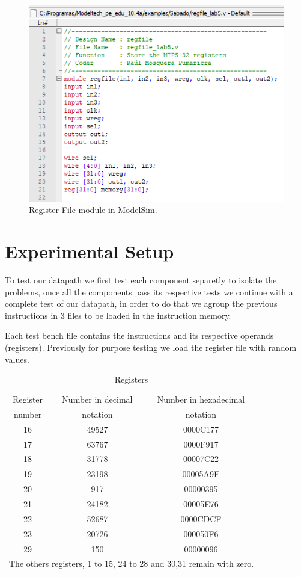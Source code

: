 \documentclass[conference]{IEEEtran}
\begin{document}
\begin{figure}[htbp]
\centerline{\includegraphics[scale=0.7]{modelsim_module.png}}
\caption{Register File module in ModelSim.}
\label{fig}
\end{figure}

\section{Experimental Setup} %
To test our datapath we first test each component separetly to isolate the
problems, once all the components pass its respective tests we continue with a complete 
test of our datapath, in order to do that we agroup the previous instructions
in 3 files to be loaded in the instruction memory.

Each test bench file contains the instructions and its respective
operands (registers). Previously for purpose testing we load the 
register file with random values.

\begin{table}[htbp]
\caption{Registers} %
\begin{center}
\begin{tabular}{|c|c|c|}
\hline
Register&Number in decimal&Number in hexadecimal\\
number&notation&notation\\
\hline
16&49527&0000C177\\
\hline
17&63767&0000F917\\
\hline
18&31778&00007C22\\
\hline
19&23198&00005A9E\\
\hline
20&917&00000395\\
\hline
21&24182&00005E76\\
\hline
22&52687&0000CDCF\\
\hline
23&20726&000050F6\\
\hline
29&150&00000096\\
\hline
\multicolumn{3}{l}{The others registers, 1 to 15, 24 to 28 and 30,31 remain with zero.}
\end{tabular}
\label{tab_regfile}
\end{center}
\end{table}
\end{document}
